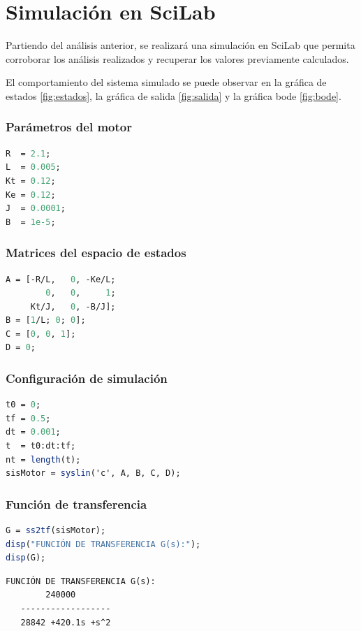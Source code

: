 \section{Simulación en SciLab}

Partiendo del análisis anterior, se realizará una simulación en SciLab
que permita corroborar los análisis realizados y recuperar los valores
previamente calculados.

El comportamiento del sistema simulado se puede observar en
la gráfica de estados \ref{fig:estados}, la gráfica de salida
\ref{fig:salida} y la gráfica bode \ref{fig:bode}.

\subsubsection{Parámetros del motor}
\begin{lstlisting}[language=Scilab]
R  = 2.1;
L  = 0.005;
Kt = 0.12;
Ke = 0.12;
J  = 0.0001;
B  = 1e-5;
\end{lstlisting}

\subsubsection{Matrices del espacio de estados}
\begin{lstlisting}[language=Scilab]
A = [-R/L,   0, -Ke/L;
        0,   0,     1;
     Kt/J,   0, -B/J];
B = [1/L; 0; 0];
C = [0, 0, 1];
D = 0;
\end{lstlisting}

\subsubsection{Configuración de simulación}
\begin{lstlisting}[language=Scilab]
t0 = 0;
tf = 0.5;
dt = 0.001;
t  = t0:dt:tf;
nt = length(t);
sisMotor = syslin('c', A, B, C, D);
\end{lstlisting}

\subsubsection{Función de transferencia}
\begin{lstlisting}[language=Scilab]
G = ss2tf(sisMotor);
disp("FUNCIÓN DE TRANSFERENCIA G(s):");
disp(G);
\end{lstlisting}

\begin{lstlisting}[style=outputstyle]
FUNCIÓN DE TRANSFERENCIA G(s):
        240000        
   ------------------  
   28842 +420.1s +s^2  
\end{lstlisting}

